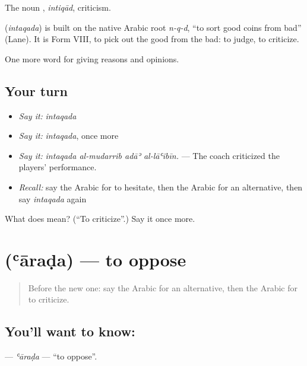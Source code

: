 The noun , \emph{intiqād}, criticism.

\begin{cousinweb}
\textbf{} (\emph{intaqada}) is built on the native Arabic root \emph{n-q-d}, \textquotedblleft{}to sort good coins from bad\textquotedblright{} (Lane). It is Form VIII, to pick out the good from the bad: to judge, to criticize.
\end{cousinweb}

\begin{grammarlens}[title={What you've built}]
One more word for giving reasons and opinions.
\end{grammarlens}

\subsection*{Your turn}
\begin{itemize}
\raggedright
  \item \emph{Say it:} \emph{intaqada}
  \item \emph{Say it:} \emph{intaqada}, once more
  \item \emph{Say it:} \emph{intaqada al-mudarrib adāʾ al-lāʿibīn.} — The coach criticized the players' performance.
  \item \emph{Recall:} say the Arabic for to hesitate, then the Arabic for an alternative, then say \emph{intaqada} again
\end{itemize}

\begin{tcolorbox}[breakable,colback=teal!4,colframe=teal!35!black,title={Before you move on}]
What does  mean? (\textquotedblleft{}To criticize\textquotedblright{}.) Say it once more.
\end{tcolorbox}
\section[\texorpdfstring{\ar{عارض} (ʿāraḍa)}{عارض (ʿāraḍa)}]{ (ʿāraḍa) — to oppose}

\label{lesson:AR-C370-aarada}



\begin{quote}
Before the new one: say the Arabic for an alternative, then the Arabic for to criticize.
\end{quote}

\subsection*{You'll want to know: }
\textbf{} — \emph{ʿāraḍa} — \textquotedblleft{}to oppose\textquotedblright{}.

